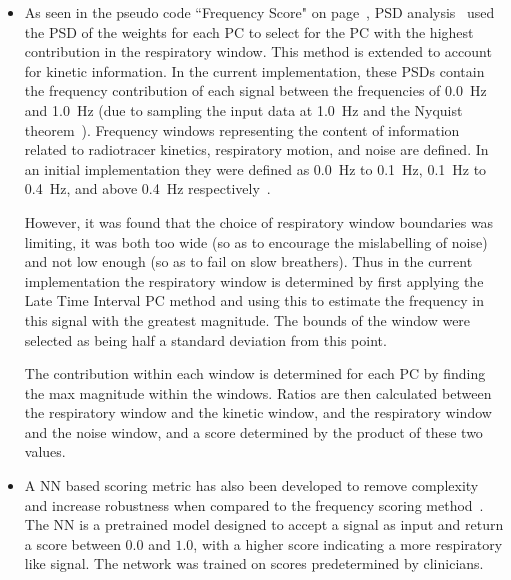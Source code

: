                     \begin{itemize}
                        \item As seen in the pseudo code ``Frequency Score" on page~\pageref{alg:pca_data_driven_surrogate_signal_extraction_methods_for_dynamic_pet_methods_score_select_and_combine_method_score_and_select_frequency_score_pseudo_code}, \gls{PSD} analysis~\parencite{Thielemans2011} used the \gls{PSD} of the weights for each \gls{PC} to select for the \gls{PC} with the highest contribution in the respiratory window. This method is extended to account for kinetic information. In the current implementation, these \glspl{PSD} contain the frequency contribution of each signal between the frequencies of \SI{0.0}{\hertz} and \SI{1.0}{\hertz} (due to sampling the input data at \SI{1.0}{\hertz} and the Nyquist theorem~\parencite{Whittaker1915OnInterpolation-Theory, Nyquist1928CertainTheory, Shannon1949CommunicationNoise}). Frequency windows representing the content of information related to radiotracer kinetics, respiratory motion, and noise are defined. In an initial implementation they were defined as \SI{0.0}{\hertz} to \SI{0.1}{\hertz}, \SI{0.1}{\hertz} to \SI{0.4}{\hertz}, and above \SI{0.4}{\hertz} respectively~\parencite{Bertolli2017}.
                        
                        However, it was found that the choice of respiratory window boundaries was limiting, it was both too wide (so as to encourage the mislabelling of noise) and not low enough (so as to fail on slow breathers). Thus in the current implementation the respiratory window is determined by first applying the Late Time Interval \gls{PC} method and using this to estimate the frequency in this signal with the greatest magnitude. The bounds of the window were selected as being half a standard deviation from this point.
                        
                        The contribution within each window is determined for each \gls{PC} by finding the max magnitude within the windows. Ratios are then calculated between the respiratory window and the kinetic window, and the respiratory window and the noise window, and a score determined by the product of these two values.
                            
                        \item %
                        A \gls{NN} based scoring metric has also been developed to remove complexity and increase robustness when compared to the frequency scoring method~\parencite{Walker2020AutomaticAI}. %
                        The \gls{NN} is a pretrained model designed to accept a signal as input and return a score between $0.0$ and $1.0$, with a higher score indicating a more respiratory like signal. The network was trained on  scores predetermined by clinicians.
                    \end{itemize}
                    
